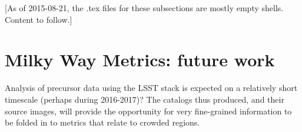 





[As of 2015-08-21, the .tex files for these subsections are mostly
  empty shells. Content to follow.]







%
%
%
%

\section{Milky Way Metrics: future work}
\def\secname{MW_future_work}\label{sec:\secname}

Analysis of precursor data using the LSST stack is expected on a
relatively short timescale (perhaps during 2016-2017)? The catalogs
thus produced, and their source images, will provide the opportunity
for very fine-grained information to be folded in to metrics that
relate to crowded regions.


\navigationbar




